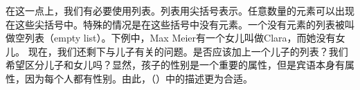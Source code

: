 在这一点上，我们有必要使用列表。列表用尖括号表示。任意数量的元素可以出现在这些尖括号中。特殊的情况是在这些括号中没有元素。一个没有元素的列表被叫做空列表（empty list）。下例中，Max Meier有一个女儿叫做Clara，而她没有女儿。
\ea
{}
\z
现在，我们还剩下与儿子有关的问题。是否应该加上一个儿子的列表？我们希望区分儿子和女儿吗？显然，孩子的性别是一个重要的属性，但是宾语本身有属性，因为每个人都有性别。由此，（）中的描述更为合适。

